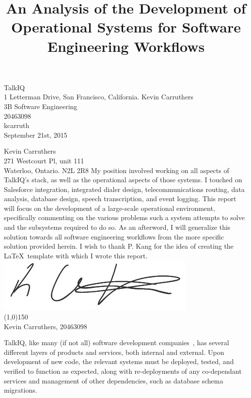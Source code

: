 \documentclass[12pt]{article}
\begin{document}
\title{An Analysis of the Development of Operational Systems for Software Engineering Workflows}
{
    TalkIQ\\
    1 Letterman Drive, San Francisco, California.
}
{
    Kevin Carruthers\\
    3B Software Engineering\\
    20463098\\
    kcarruth\\
    September 21st, 2015
}


{
    \noindent
    Kevin Carruthers\\
    271 Westcourt Pl, unit 111\\
    Waterloo, Ontario. N2L 2R8
}
{
    My position involved working on all aspects of TalkIQ's stack, as well as the operational aspects of those systems. I touched on Salesforce integration, integrated dialer design, telecommunications routing, data analysis, database design, speech transcription, and event logging.
}
{
    This report will focus on the development of a large-scale operational environment, specifically commenting on the various problems such a system attempts to solve and the subsystems required to do so. As an afterword, I will generalize this solution towards all software engineering workflows from the more specific solution provided herein.
}
{
    I wish to thank P. Kang for the idea of creating the \LaTeX\ template with which I wrote this report.
}
{
    \includegraphics[scale=0.5]{signature.jpg}\\
    \line(1,0){150}\\
    Kevin Carruthers, 20463098
}


TalkIQ, like many (if not all) software development companies~\cite{component}, has several different layers of products and services, both internal and external. Upon development of new code, the relevant systems must be deployed, tested, and verified to function as expected, along with re-deployments of any co-dependant services and management of other dependencies, such as database schema migrations.
\end{document}
